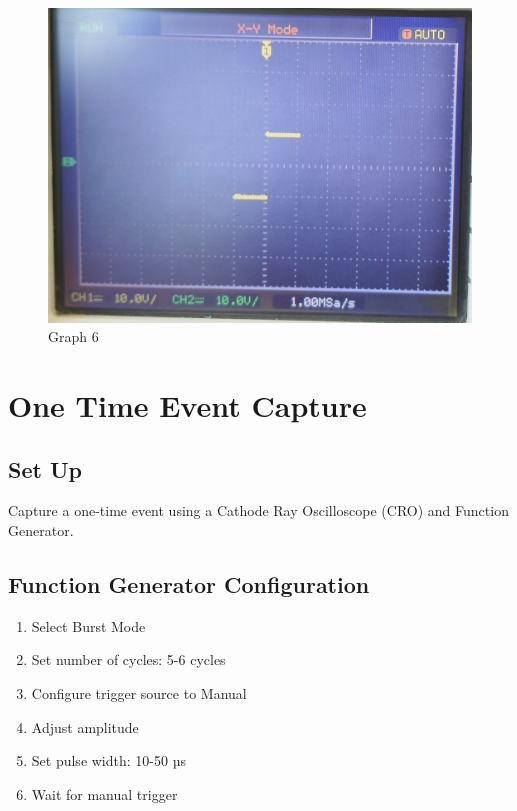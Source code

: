 \documentclass[12pt,a4paper]{report}
\begin{document}
\begin{figure}[H]
\begin{minipage}[c]{0.48\textwidth}
    \end{minipage}
    \hfill
    \begin{minipage}[c]{0.48\textwidth}
        \includegraphics[width=\textwidth]{figs/6cro.jpg} %
        
    \end{minipage}
    \caption{Graph 6}
    \label{fig:CRO-patterns}
\end{figure}

\chapter{One Time Event Capture}
\section{Set Up}
Capture a one-time event using a Cathode Ray Oscilloscope (CRO) and Function Generator.

\section*{Function Generator Configuration}
\begin{enumerate}[leftmargin=*]
    \item Select Burst Mode
    \item Set number of cycles: 5-6 cycles
    \item Configure trigger source to Manual
    \item Adjust amplitude
    \item Set pulse width: 10-50 µs
    \item Wait for manual trigger
\end{enumerate}
\end{document}
